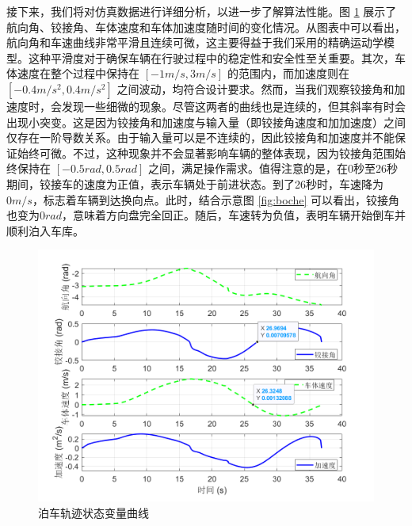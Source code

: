 \documentclass[master,academic]{ysuthesis} %
\begin{document}
		接下来，我们将对仿真数据进行详细分析，以进一步了解算法性能。图 \ref{fig:databochestate} 展示了航向角、铰接角、车体速度和车体加速度随时间的变化情况。从图表中可以看出，航向角和车速曲线非常平滑且连续可微，这主要得益于我们采用的精确运动学模型。这种平滑度对于确保车辆在行驶过程中的稳定性和安全性至关重要。其次，车体速度在整个过程中保持在 $[-1m/s, 3m/s]$ 的范围内，而加速度则在 $[-0.4m/s^2, 0.4m/s^2]$ 之间波动，均符合设计要求。然而，当我们观察铰接角和加速度时，会发现一些细微的现象。尽管这两者的曲线也是连续的，但其斜率有时会出现小突变。这是因为铰接角和加速度与输入量（即铰接角速度和加加速度）之间仅存在一阶导数关系。由于输入量可以是不连续的，因此铰接角和加速度并不能保证始终可微。不过，这种现象并不会显著影响车辆的整体表现，因为铰接角范围始终保持在 $[-0.5rad, 0.5rad]$ 之间，满足操作需求。值得注意的是，在0秒至26秒期间，铰接车的速度为正值，表示车辆处于前进状态。到了26秒时，车速降为$0 m/s$，标志着车辆到达换向点。此时，结合示意图 \ref{fig:boche} 可以看出，铰接角也变为$0 rad$，意味着方向盘完全回正。随后，车速转为负值，表明车辆开始倒车并顺利泊入车库。
		\begin{figure}[!ht]
			\centering
			\includegraphics[width=1\textwidth]{databochestate.png}
			\caption{泊车轨迹状态变量曲线}
			\label{fig:databochestate}
		\end{figure}
\end{document}
